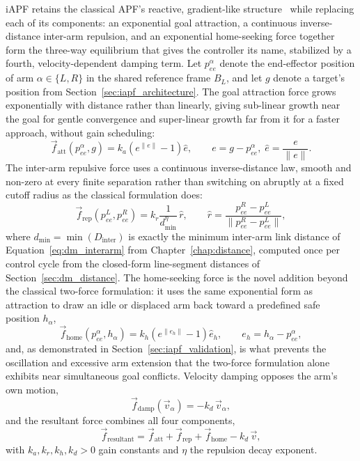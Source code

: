 iAPF retains the classical APF's reactive, gradient-like structure~\citep{khatib1986real} while
replacing each of its components: an exponential goal attraction, a continuous inverse-distance
inter-arm repulsion, and an exponential home-seeking force together form the three-way equilibrium
that gives the controller its name, stabilized by a fourth, velocity-dependent damping term. Let
$p_{ee}^\alpha$ denote the end-effector position of arm $\alpha \in \{L, R\}$ in the shared reference
frame $B_L$, and let $g$ denote a target's position from Section~\ref{sec:iapf_architecture}. The
goal attraction force grows exponentially with distance rather than linearly, giving sub-linear
growth near the goal for gentle convergence and super-linear growth far from it for a faster
approach, without gain scheduling:
\begin{equation}
\vec{f}_{\text{att}}(p_{ee}^\alpha, g) = k_a \left( e^{\lVert e \rVert} - 1 \right) \hat{e}, \qquad
e = g - p_{ee}^\alpha,\; \hat{e} = \frac{e}{\lVert e \rVert}.
\label{eq:iapf_attract}
\end{equation}
The inter-arm repulsive force uses a continuous inverse-distance law, smooth and non-zero at every
finite separation rather than switching on abruptly at a fixed cutoff radius as the classical
formulation does:
\begin{equation}
\vec{f}_{\text{rep}}(p_{ee}^L, p_{ee}^R) = k_r \frac{1}{d_{\min}^{\eta}}\, \hat{r}, \qquad
\hat{r} = \frac{p_{ee}^R - p_{ee}^L}{\lVert p_{ee}^R - p_{ee}^L \rVert},
\label{eq:iapf_repel}
\end{equation}
where $d_{\min} = \min(D_{\text{inter}})$ is exactly the minimum inter-arm link distance of
Equation~\eqref{eq:dm_interarm} from Chapter~\ref{chap:distance}, computed once per control cycle
from the closed-form line-segment distances of Section~\ref{sec:dm_distance}. The home-seeking
force is the novel addition beyond the classical two-force formulation: it uses the same exponential
form as attraction to draw an idle or displaced arm back toward a predefined safe position
$h_\alpha$,
\begin{equation}
\vec{f}_{\text{home}}(p_{ee}^\alpha, h_\alpha) = k_h \left( e^{\lVert e_h \rVert} - 1 \right) \hat{e}_h,
\qquad e_h = h_\alpha - p_{ee}^\alpha,
\label{eq:iapf_home}
\end{equation}
and, as demonstrated in Section~\ref{sec:iapf_validation}, is what prevents the oscillation and
excessive arm extension that the two-force formulation alone exhibits near simultaneous goal
conflicts. Velocity damping opposes the arm's own motion,
\begin{equation}
\vec{f}_{\text{damp}}(\vec{v}_\alpha) = -k_d\, \vec{v}_\alpha,
\label{eq:iapf_damp}
\end{equation}
and the resultant force combines all four components,
\begin{equation}
\vec{f}_{\text{resultant}} = \vec{f}_{\text{att}} + \vec{f}_{\text{rep}} + \vec{f}_{\text{home}}
- k_d\, \vec{v},
\label{eq:iapf_resultant}
\end{equation}
with $k_a, k_r, k_h, k_d > 0$ gain constants and $\eta$ the repulsion decay exponent.

